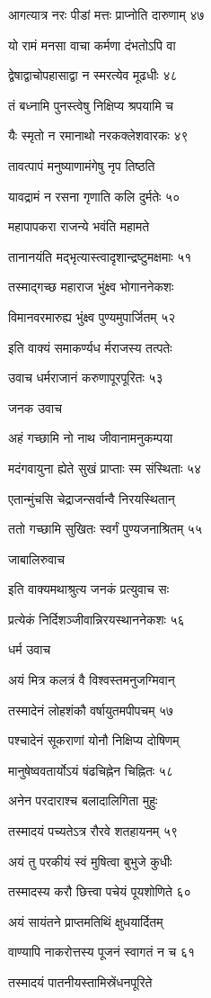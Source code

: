 आगत्यात्र नरः पीडां मत्तः प्राप्नोति दारुणाम् ४७

यो रामं मनसा वाचा कर्मणा दंभतोऽपि वा

द्वेषाद्वाचोपहासाद्वा न स्मरत्येव मूढधीः ४८

तं बध्नामि पुनस्त्वेषु निक्षिप्य श्रपयामि च

यैः स्मृतो न रमानाथो नरकक्लेशवारकः ४९

तावत्पापं मनुष्याणामंगेषु नृप तिष्ठति

यावद्रामं न रसना गृणाति कलि दुर्मतेः ५०

महापापकरा राजन्ये भवंति महामते

तानानयंति मद्भृत्यास्त्वादृशान्द्रष्टुमक्षमाः ५१

तस्माद्गच्छ महाराज भुंक्ष्व भोगाननेकशः

विमानवरमारुह्य भुंक्ष्व पुण्यमुपार्जितम् ५२

इति वाक्यं समाकर्ण्यध र्मराजस्य तत्पतेः

उवाच धर्मराजानं करुणापूरपूरितः ५३

जनक उवाच

अहं गच्छामि नो नाथ जीवानामनुकम्पया

मदंगवायुना ह्येते सुखं प्राप्ताः स्म संस्थिताः ५४

एतान्मुंचसि चेद्राजन्सर्वान्वै निरयस्थितान्

ततो गच्छामि सुखितः स्वर्गं पुण्यजनाश्रितम् ५५

जाबालिरुवाच

इति वाक्यमथाश्रुत्य जनकं प्रत्युवाच सः

प्रत्येकं निर्दिशञ्जीवान्निरयस्थाननेकशः ५६

धर्म उवाच

अयं मित्र कलत्रं वै विश्वस्तमनुजग्मिवान्

तस्मादेनं लोहशंकौ वर्षायुतमपीपचम् ५७

पश्चादेनं सूकराणां योनौ निक्षिप्य दोषिणम्

मानुषेष्ववतार्योऽयं षंढचिह्नेन चिह्नितः ५८

अनेन परदाराश्च बलादालिगिता मुहुः

तस्मादयं पच्यतेऽत्र रौरवे शतहायनम् ५९

अयं तु परकीयं स्वं मुषित्वा बुभुजे कुधीः

तस्मादस्य करौ छित्त्वा पचेयं पूयशोणिते ६०

अयं सायंतने प्राप्तमतिथिं क्षुधयार्दितम्

वाण्यापि नाकरोत्तस्य पूजनं स्वागतं न च ६१

तस्मादयं पातनीयस्तामिस्रेंधनपूरिते

